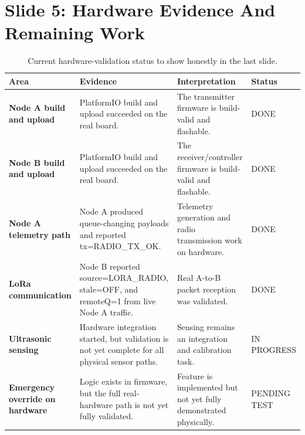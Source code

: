 \documentclass[11pt,a4paper]{article}
\begin{document}
\clearpage

\section{Slide 5: Hardware Evidence And Remaining Work}

\begin{table}[h!]
\centering
\small
\begin{tabularx}{\textwidth}{>{\bfseries}p{} >{\raggedright\arraybackslash}p{} Y >{\raggedright\arraybackslash}p{0.12\textwidth}}
\toprule
Area & Evidence & Interpretation & Status \\
\midrule
Node A build and upload & PlatformIO build and upload succeeded on the real board. & The transmitter firmware is build-valid and flashable. & \textcolor{okgreen}{DONE} \\
Node B build and upload & PlatformIO build and upload succeeded on the real board. & The receiver/controller firmware is build-valid and flashable. & \textcolor{okgreen}{DONE} \\
Node A telemetry path & Node A produced queue-changing payloads and reported tx=RADIO\_TX\_OK. & Telemetry generation and radio transmission work on hardware. & \textcolor{okgreen}{DONE} \\
LoRa communication & Node B reported source=LORA\_RADIO, stale=OFF, and remoteQ=1 from live Node A traffic. & Real A-to-B packet reception was validated. & \textcolor{okgreen}{DONE} \\
Ultrasonic sensing & Hardware integration started, but validation is not yet complete for all physical sensor paths. & Sensing remains an integration and calibration task. & \textcolor{warnorange}{IN PROGRESS} \\
Emergency override on hardware & Logic exists in firmware, but the full real-hardware path is not yet fully validated. & Feature is implemented but not yet fully demonstrated physically. & \textcolor{warnorange}{PENDING TEST} \\
\bottomrule
\end{tabularx}
\caption{Current hardware-validation status to show honestly in the last slide.}
\end{table}
\end{document}
